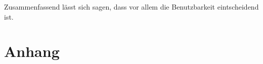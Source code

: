 \documentclass{article}
\begin{document}
Zusammenfassend lässt sich sagen, dass vor allem die Benutzbarkeit eintscheidend ist.


\section{Anhang}

\glsaddall
\printglossary[numberedsection, style=altlist]
\end{document}
